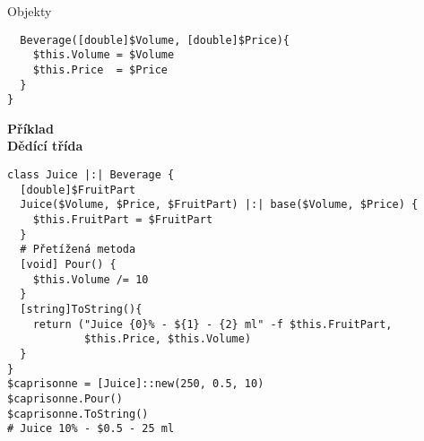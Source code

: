 \documentclass[main.tex]{subfiles}
\begin{document}
\begin{frame}{Objekty}
\begin{verbatim}
  Beverage([double]$Volume, [double]$Price){
    $this.Volume = $Volume
    $this.Price  = $Price
  }
}
\end{verbatim}
\framebreak
\textbf{Příklad\\Dědící třída}
\begin{verbatim}
class Juice |:| Beverage {
  [double]$FruitPart
  Juice($Volume, $Price, $FruitPart) |:| base($Volume, $Price) {
    $this.FruitPart = $FruitPart
  }
  # Přetížená metoda
  [void] Pour() {
    $this.Volume /= 10
  }
  [string]ToString(){
    return ("Juice {0}% - ${1} - {2} ml" -f $this.FruitPart,
            $this.Price, $this.Volume)
  }
}
$caprisonne = [Juice]::new(250, 0.5, 10)
$caprisonne.Pour()
$caprisonne.ToString()
# Juice 10% - $0.5 - 25 ml
\end{verbatim}
\end{frame}
\end{document}
